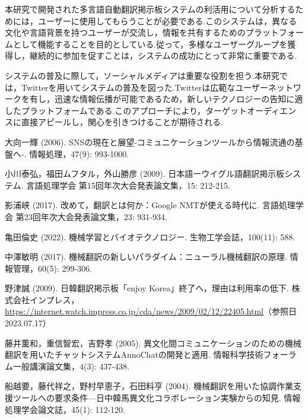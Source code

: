 \documentclass[b5paper,12pt]{jsreport}
\begin{document}
本研究で開発された多言語自動翻訳掲示板システムの利活用について分析するためには，ユーザーに使用してもらうことが必要である.このシステムは，異なる文化や言語背景を持つユーザーが交流し，情報を共有するためのプラットフォームとして機能することを目的としている.従って，多様なユーザーグループを獲得し，継続的に参加を促すことは，システムの成功にとって非常に重要である.

システムの普及に際して，ソーシャルメディアは重要な役割を担う.本研究では，Twitterを用いてシステムの普及を図った.Twitterは広範なユーザーネットワークを有し，迅速な情報伝播が可能であるため，新しいテクノロジーの告知に適したプラットフォームである.このアプローチにより，ターゲットオーディエンスに直接アピールし，関心を引きつけることが期待される.

\begin{thebibliography}{99}

大向一輝 (2006). SNSの現在と展望-コミュニケーションツールから情報流通の基盤へ-. 情報処理，47(9): 993-1000.

小川泰弘，福田ムフタル，外山勝彦 (2009). 日本語ーウイグル語翻訳掲示板システム. 言語処理学会 第15回年次大会発表論文集，15: 212-215.

影浦峡 (2017). 改めて，翻訳とは何か：Google NMTが使える時代に. 言語処理学会 第23回年次大会発表論文集，23: 931-934.

亀田倫史 (2022). 機械学習とバイオテクノロジー. 生物工学会誌，100(11): 588.

中澤敏明 (2017). 機械翻訳の新しいパラダイム：ニューラル機械翻訳の原理. 情報管理，60(5): 299-306.

野津誠 (2009). 日韓翻訳掲示板「enjoy Korea」終了へ，理由は利用率の低下. 株式会社インプレス，\url{https://internet.watch.impress.co.jp/cda/news/2009/02/12/22405.html}（参照日2023.07.17）

藤井薫和，重信智宏，吉野孝 (2005). 異文化間コミュニケーションのための機械翻訳を用いたチャットシステムAnnoChatの開発と適用. 情報科学技術フォーラム一般講演論文集，4(3): 437-438.

船越要，藤代祥之，野村早恵子，石田料亨 (2004). 機械翻訳を用いた協調作業支援ツールへの要求条件—日中韓馬異文化コラボレーション実験からの知見. 情報処理学会論文誌，45(1): 112-120.



\end{thebibliography}
\end{document}
